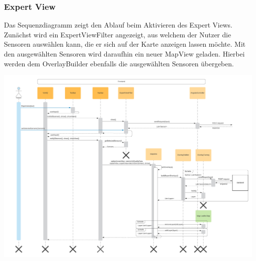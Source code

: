 \subsubsection{Expert View}
\label{Screenshots}
Das Sequenzdiagramm zeigt den Ablauf beim Aktivieren des Expert Views. Zunächst wird ein ExpertViewFilter angezeigt, aus welchem der Nutzer die Sensoren auswählen kann, die er sich auf der Karte anzeigen lassen möchte. Mit den ausgewählten Sensoren wird daraufhin ein neuer MapView geladen. Hierbei werden dem OverlayBuilder ebenfalls die ausgewählten Sensoren übergeben.
\begin{center}
	\includegraphics[width=1\textwidth]{media/frontend/sequence-diagram/sequenceExpertViewFilter.png} 
\end{center}


